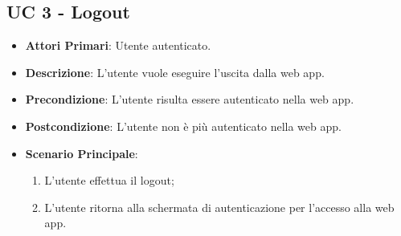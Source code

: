 
		\subsection{UC 3 - Logout}
		\begin{itemize}
			\item \textbf{Attori Primari}: Utente autenticato.
			\item \textbf{Descrizione}: L'utente vuole eseguire l'uscita dalla web app.
			\item \textbf{Precondizione}: L'utente risulta essere autenticato nella web app.
			\item \textbf{Postcondizione}: L'utente non è più autenticato nella web app.
			\item \textbf{Scenario Principale}:
			\begin{enumerate}
				\item L'utente effettua il logout;
				\item L'utente ritorna alla schermata di autenticazione per l'accesso alla web app.
			\end{enumerate}	
		\end{itemize}


		


		



		


		



		


